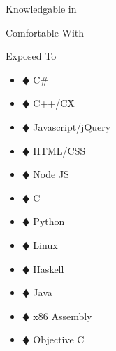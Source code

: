 \documentclass{article}
\newcommand{\lineseparator}[1]{\noindent\makebox[\linewidth]{\rule{\textwidth}{#1}}}
\begin{document}
\begin{minipage}[t]{0.33\textwidth}
  {\Large Knowledgable in }\\ 
\end{minipage}
\begin{minipage}[t]{0.33\textwidth}
  {\Large Comfortable With }\\ 
\end{minipage}
\begin{minipage}[t]{0.34\textwidth}
  {\Large Exposed To }\\ 
\end{minipage}
\lineseparator{0.5pt}
\begin{minipage}[t]{0.33\textwidth}
  \vspace{0.5mm}
  \begin {itemize}
    \item[$\vardiamond$] C\# 
    \item[$\vardiamond$] C++/CX 
    \item[$\vardiamond$] Javascript/jQuery 
    \item[$\vardiamond$] HTML/CSS 
  \end{itemize}
\end{minipage}
\begin{minipage}[t]{0.33\textwidth}
  \vspace{0.5mm}
  \begin {itemize}
    \item[$\vardiamond$] Node JS 
    \item[$\vardiamond$] C 
    \item[$\vardiamond$] Python 
    \item[$\vardiamond$] Linux
  \end{itemize}
\end{minipage}
\begin{minipage}[t]{0.34\textwidth}
  \vspace{0.5mm}
  \begin {itemize}
    \item[$\vardiamond$] Haskell 
    \item[$\vardiamond$] Java 
    \item[$\vardiamond$] x86 Assembly 
    \item[$\vardiamond$] Objective C 
  \end{itemize}
\end{minipage}
\end{document}
